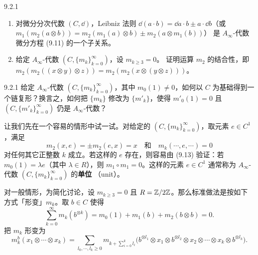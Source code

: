 \begin{wexer}{9.2.1}
  \begin{enumerate}[label=(\alph*)]
    \item 对微分分次代数 $(C,\dd)$，Leibniz 法则
      $\dd(a\cdot b)=\dd a\cdot b\pm a\cdot\dd b$（或
      $m_1(m_2(a\otimes b))=m_2(m_1(a)\otimes b)\pm m_2(a\otimes m_1(b))$）
      是 $A_\infty$-代数微分方程 (9.11) 的一个子关系。
    \item 给定 $A_\infty$-代数 $(C,\{m_k\}_{k=0}^\infty)$，设 $m_{k\geqslant3}=0$。
      证明运算 $m_2$ 的结合性，即
      $m_2(m_2((x\otimes y)\otimes z))=m_2(m_2(x\otimes(y\otimes z)))$。
  \end{enumerate}
\end{wexer}

\begin{wque}{9.2.1}
  给定 $A_\infty$-代数 $(C,\{m_k\}_{k=0}^\infty)$，其中 $m_0(1)\neq0$，如何以 $C$
  为基础得到一个链复形？换言之，如何把 $\{m_k\}$ 修改为 $\{m'_k\}$，使得
  $m'_0(1)=0$ 且 $(C,\{m'_k\}_{k=0}^\infty)$ 仍是 $A_\infty$-代数？
\end{wque}

让我们先在一个容易的情形中试一试。对给定的 $(C,\{m_k\}_{k=0}^\infty)$，取元素
$e\in C^1$，满足
\begin{equation*}
  m_2(x,e)=\pm m_2(e,x)=x\quad\text{和}\quad m_k(\cdots,e,\cdots)=0
\end{equation*}
对任何其它正整数 $k$ 成立。若这样的 $e$ 存在，则容易由 (9.13) 验证：若
$m_0(1)=\lambda e$（其中 $\lambda\in R$），则 $m_1\circ m_1=0$。这样的元素
$e\in C^1$ 通常称为 $A_\infty$-代数 $(C,\{m_k\}_{k=0}^\infty)$ 的\textbf{单位}
（unit）。

对一般情形，为简化讨论，设 $m_{k\geqslant3}=0$ 且 $R=\mathbb{Z}/2\mathbb{Z}$。那么标准做法是按如下
方式「形变」$m_k$。取 $b\in C$ 使得
\begin{equation}\tag{9.14}
  \sum_{k=0}^\infty m_k(b^{\otimes k})
  =m_0(1)+m_1(b)+m_2(b\otimes b)=0.
\end{equation}
把 $m_k$ 形变为
\begin{equation}\tag{9.15}
  m_k^b(x_1\otimes\cdots\otimes x_k)
  =\sum_{l_0,\cdots,l_k\geqslant0}
  m_{k+\sum_{i=0}^k l_i}
  \bigl(b^{\otimes l_1}\otimes x_1\otimes b^{\otimes l_2}\otimes x_2\otimes\cdots
  \otimes x_k\otimes b^{\otimes l_k}\bigr).
\end{equation}

